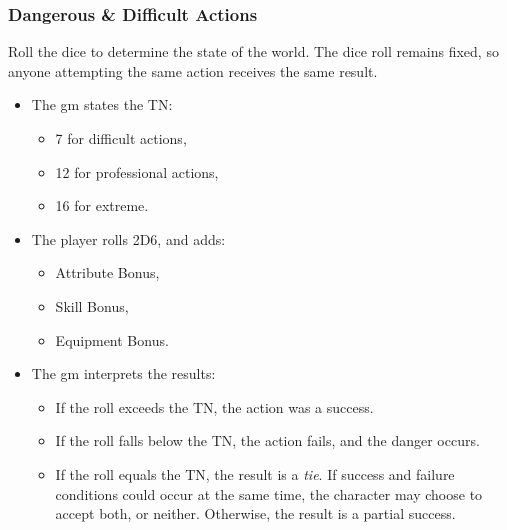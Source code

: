 \subsubsection*{Dangerous \& Difficult Actions}

Roll the dice to determine the state of the world.
The dice roll remains fixed, so anyone attempting the same action receives the same result.

\begin{itemize}
  \item
  The \gls{gm} states the TN:

  \begin{itemize}
    \item
    7 for difficult actions,
    \item
    12 for professional actions,
    \item
    16 for extreme.
  \end{itemize}
  \item
  The player rolls 2D6, and adds:
  \begin{itemize}
    \item
    Attribute Bonus,
    \item
    Skill Bonus,
    \item
    Equipment Bonus.
  \end{itemize}
  \item
  The \gls{gm} interprets the results:
  \begin{itemize}
    \item
    If the roll exceeds the TN, the action was a success.
    \item
    If the roll falls below the TN, the action fails, and the danger occurs.
    \item
    If the roll equals the TN, the result is a \emph{tie}.
    If success and failure conditions could occur at the same time, the character may choose to accept both, or neither.
    Otherwise, the result is a partial success.
    \end{itemize}
\end{itemize}
